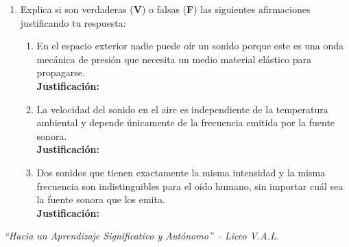 \documentclass[11pt, letterpaper]{article}
\newif\ifshowanswers
\newcommand{\answer}[1]{%
	\ifshowanswers
	\par\vspace{0.15cm}
	\begin{tcolorbox}[colback=blue!5!white, colframe=blue!60!white, arc=1mm, boxrule=0.5pt, title=\textbf{\footnotesize SOLUCIÓN PASO A PASO (DOCENTE)}]
		\color{blue!80!black}\footnotesize #1
	\end{tcolorbox}
	\par\vspace{0.15cm}
	\else
	\par\vspace{0.3cm}
	\fi
}
\begin{document}
\begin{enumerate}[leftmargin=*, itemsep=0.8cm]
		\item Explica si son verdaderas (\textbf{V}) o falsas (\textbf{F}) las siguientes afirmaciones justificando tu respuesta:
		\begin{enumerate}[label=\alph*), itemsep=0.4cm]
			\item \underline{\hspace{1.2cm}} En el espacio exterior nadie puede oír un sonido porque este es una onda mecánica de presión que necesita un medio material elástico para propagarse. \\[0.15cm]
			\textbf{Justificación:} \hrulefill \\[0.15cm]
			\mbox{}\hrulefill
			\item \underline{\hspace{1.2cm}} La velocidad del sonido en el aire es independiente de la temperatura ambiental y depende únicamente de la frecuencia emitida por la fuente sonora. \\[0.15cm]
			\textbf{Justificación:} \hrulefill \\[0.15cm]
			\mbox{}\hrulefill
			\item \underline{\hspace{1.2cm}} Dos sonidos que tienen exactamente la misma intensidad y la misma frecuencia son indistinguibles para el oído humano, sin importar cuál sea la fuente sonora que los emita. \\[0.15cm]
			\textbf{Justificación:} \hrulefill \\[0.15cm]
			\mbox{}\hrulefill
		\end{enumerate}
		\answer{
			\textbf{a) Verdadero (V)}.\\[0.05cm]
			\textbf{Justificación:} El sonido es una onda mecánica longitudinal (onda de presión) producida por la vibración de un objeto en un medio elástico (sólido, líquido o gas); en el vacío no existen partículas que se compriman y extiendan para propagarlo.\\[0.1cm]
			\textbf{b) Falso (F)}.\\[0.05cm]
			\textbf{Justificación:} La velocidad del sonido depende de las características del medio (elasticidad y densidad) y de su temperatura, tal como lo expresa el modelo $v \approx 331 + 0,61 \cdot T \ \mathbf{(I)}$, por lo que a mayor temperatura del aire, mayor es la velocidad del sonido.\\[0.1cm]
			\textbf{c) Falso (F)}.\\[0.05cm]
			\textbf{Justificación:} Aunque dos sonidos tengan el mismo tono (frecuencia) y la misma intensidad (volumen), podemos distinguirlos gracias al \textbf{timbre}, ya que cada instrumento o voz emite diferentes armónicos simultáneamente junto con la frecuencia fundamental.
		}
		
	\end{enumerate}
	
	\vfill
	\begin{center}
		\textit{\color{valdark!70} ``Hacia un Aprendizaje Significativo y Autónomo'' -- Liceo V.A.L.}
	\end{center}
	
\end{document}
